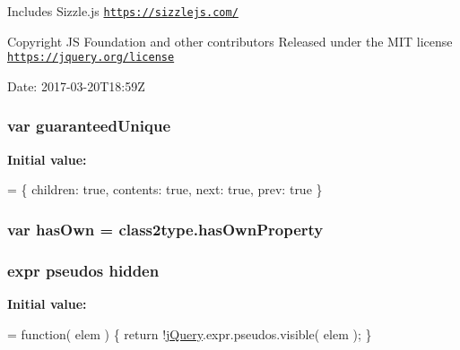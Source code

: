 Includes Sizzle.\+js \href{https://sizzlejs.com/}{\tt https\+://sizzlejs.\+com/}

Copyright JS Foundation and other contributors Released under the M\+IT license \href{https://jquery.org/license}{\tt https\+://jquery.\+org/license}

Date\+: 2017-\/03-\/20\+T18\+:59Z 
\subsubsection[{\texorpdfstring{guaranteed\+Unique}{guaranteedUnique}}]{\setlength{\rightskip}{0pt plus 5cm}var guaranteed\+Unique}\hypertarget{jquery-3_82_81_8js_a0b6c67c8bd08943b49b83df5a891cf5e}{}\label{jquery-3_82_81_8js_a0b6c67c8bd08943b49b83df5a891cf5e}
{\bfseries Initial value\+:}
\begin{DoxyCode}
= \{
        children: \textcolor{keyword}{true},
        contents: \textcolor{keyword}{true},
        next: \textcolor{keyword}{true},
        prev: \textcolor{keyword}{true}
    \}
\end{DoxyCode}
\subsubsection[{\texorpdfstring{has\+Own}{hasOwn}}]{\setlength{\rightskip}{0pt plus 5cm}var has\+Own = class2type.\+has\+Own\+Property}\hypertarget{jquery-3_82_81_8js_a0511343fcdbac93090154dce865cbfd5}{}\label{jquery-3_82_81_8js_a0511343fcdbac93090154dce865cbfd5}
\subsubsection[{\texorpdfstring{hidden}{hidden}}]{ {\bf expr} pseudos hidden}\hypertarget{jquery-3_82_81_8js_a1ca5d98f4455c95e2e81c0db83d5b285}{}\label{jquery-3_82_81_8js_a1ca5d98f4455c95e2e81c0db83d5b285}
{\bfseries Initial value\+:}
\begin{DoxyCode}
= \textcolor{keyword}{function}( elem ) \{
    \textcolor{keywordflow}{return} !\hyperlink{jquery-3_82_81_8js_a609525712f1102566c2b03866ceb2bba}{jQuery}.expr.pseudos.visible( elem );
\}
\end{DoxyCode}
